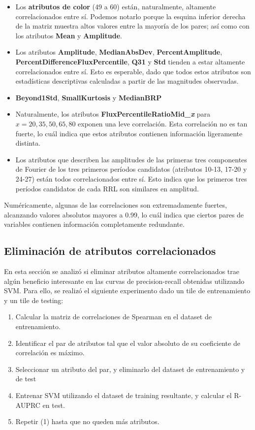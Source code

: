 \begin{itemize}
\item Los \textbf{atributos de color} (49 a 60) están, naturalmente, altamente correlacionados entre sí. Podemos notarlo porque la esquina inferior derecha de la matriz muestra altos valores entre la mayoría de los pares; así como con los atributos \textbf{Mean} y \textbf{Amplitude}.
\item Los atributos \textbf{Amplitude}, \textbf{MedianAbsDev}, \textbf{PercentAmplitude}, \textbf{PercentDifferenceFluxPercentile}, \textbf{Q31} y \textbf{Std} tienden a estar altamente correlacionados entre sí. Esto es esperable, dado que todos estos atributos son estadísticas descriptivas calculadas a partir de las magnitudes observadas.
\item \textbf{Beyond1Std}, \textbf{SmallKurtosis} y \textbf{MedianBRP}
\item Naturalmente, los atributos \textbf{FluxPercentileRatioMid\_\textit{x}} para $x=20, 35, 50, 65, 80$ exponen una leve correlación. Esta correlación no es tan fuerte, lo cuál indica que estos atributos contienen información ligeramente distinta.
\item Los atributos que describen las amplitudes de las primeras tres componentes de Fourier de los tres primeros períodos candidatos (atributos 10-13, 17-20 y 24-27) están todos correlacionados entre sí. Esto indica que los primeros tres períodos candidatos de cada RRL son similares en amplitud.
\end{itemize}

Numéricamente, algunas de las correlaciones son extremadamente fuertes, alcanzando valores absolutos mayores a 0.99, lo cuál indica que ciertos pares de variables contienen información completamente redundante.

\subsection{ Eliminación de atributos correlacionados }

En esta sección se analizó si eliminar atributos altamente correlacionados trae algún beneficio interesante en las curvas de precision-recall obtenidas utilizando SVM. Para ello, se realizó el siguiente experimento dado un tile de entrenamiento y un tile de testing:

\begin{enumerate}
\item Calcular la matriz de correlaciones de Spearman en el dataset de entrenamiento.
\item Identificar el par de atributos tal que el valor absoluto de su coeficiente de correlación es máximo.
\item Seleccionar un atributo del par, y eliminarlo del dataset de entrenamiento y de test
\item Entrenar SVM utilizando el dataset de training resultante, y calcular el R-AUPRC en test.
\item Repetir (1) hasta que no queden más atributos.
\end{enumerate}


